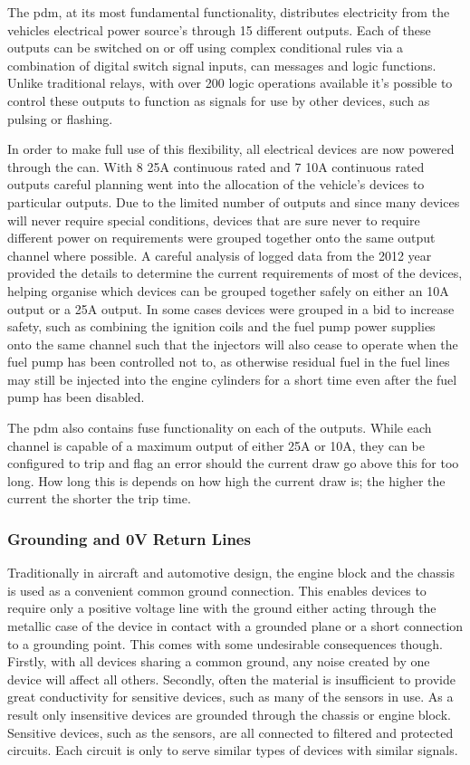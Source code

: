 The \acrshort{pdm}, at its most fundamental functionality, distributes electricity from the vehicles electrical power source's through 15 different outputs.  Each of these outputs can  be switched on or off using complex conditional rules via a combination of digital switch signal inputs, \acrshort{can} messages and logic functions.  Unlike traditional relays, with over 200 logic operations available it's possible to control these outputs to function as signals for use by other devices, such as pulsing or flashing.

In order to make full use of this flexibility, all electrical devices are now powered through the \acrshort{can}.  With 8 25A continuous rated and 7 10A continuous rated outputs  careful planning went into the allocation of the vehicle's devices to particular outputs.  Due to the limited number of outputs and since many devices will never require special conditions, devices that are sure never to require different power on requirements were grouped together onto the same output channel where possible.  A careful analysis of logged data from the 2012 year provided the details to determine the current requirements of most of the devices, helping organise which devices can be grouped together safely on either an 10A output or a 25A output.  In some cases devices were grouped in a bid to increase safety, such as combining the ignition coils and the fuel pump power supplies onto the same channel such that the injectors will also cease to operate when the fuel pump has been controlled not to, as otherwise residual fuel in the fuel lines may still be injected into the engine cylinders for a short time even after the fuel pump has been disabled.

The \acrshort{pdm} also contains fuse functionality on each of the outputs.  While each channel is capable of a maximum output of either 25A or 10A, they can be configured to trip and flag an error should the current draw go above this for too long.  How long this is depends on how high the current draw is; the higher the current the shorter the trip time.

\subsubsection{Grounding and 0V Return Lines}

Traditionally in aircraft and automotive design, the engine block and the chassis is used as a convenient common ground connection.  This enables devices to require only a positive voltage line with the ground either acting through the metallic case of the device in contact with a grounded plane or a short connection to a grounding point.  This comes with some undesirable consequences though.  Firstly, with all devices sharing a common ground, any noise created by one device will affect all others.  Secondly, often the material is insufficient to provide great conductivity for sensitive devices, such as many of the sensors in use.  As a result only insensitive devices are grounded through the chassis or engine block.  Sensitive devices, such as the sensors, are all connected to filtered and protected circuits.  Each circuit is only to serve similar types of devices with similar signals.

